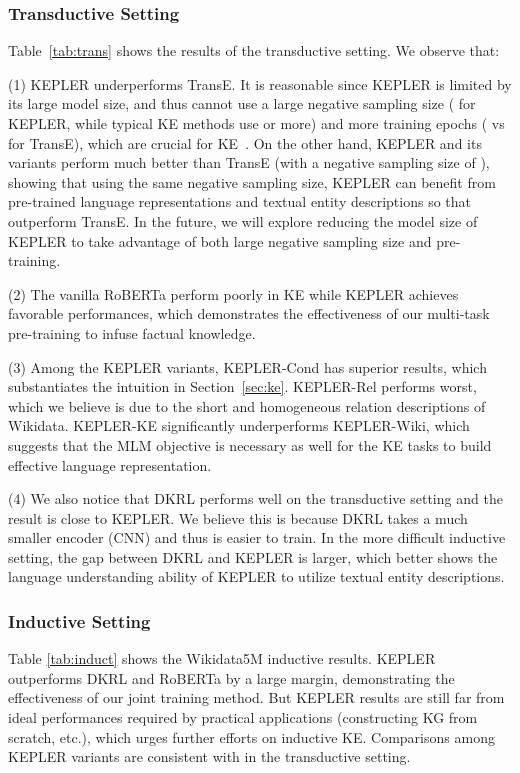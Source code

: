 \subsubsection*{Transductive Setting}




Table~\ref{tab:trans} shows the results of the transductive setting. We observe that: 

(1) KEPLER underperforms TransE. It is reasonable since KEPLER is limited by its large model size, and thus cannot use a large negative sampling size ( for KEPLER, while typical KE methods use  or more) and more training epochs ( vs  for TransE), which are crucial for KE~\citep{zhu2019graphvite}. On the other hand, KEPLER and its variants perform much better than TransE (with a negative sampling size of ), showing that using the same negative sampling size, KEPLER can benefit from pre-trained language representations and textual entity descriptions so that outperform TransE. In the future, we will explore reducing the model size of KEPLER to take advantage of both large negative sampling size and pre-training.

(2) The vanilla RoBERTa perform poorly in KE while KEPLER achieves favorable performances, which demonstrates the effectiveness of our multi-task pre-training to infuse factual knowledge. 

(3) Among the KEPLER variants, KEPLER-Cond has superior results, which substantiates the intuition in Section~\ref{sec:ke}. KEPLER-Rel performs worst, which we believe is due to the short and homogeneous relation descriptions of Wikidata. KEPLER-KE significantly underperforms KEPLER-Wiki, which suggests that the MLM objective is necessary as well for the KE tasks to build effective language representation.

(4) We also notice that DKRL performs well on the transductive setting and the result is close to KEPLER. We believe this is because DKRL takes a much smaller encoder (CNN) and thus is easier to train. In the more difficult inductive setting, the gap between DKRL and KEPLER is larger, which better shows the language understanding ability of KEPLER to utilize textual entity descriptions.



\subsubsection*{Inductive Setting}

Table \ref{tab:induct} shows the Wikidata5M inductive results. KEPLER outperforms DKRL and RoBERTa by a large margin, demonstrating the effectiveness of our joint training method. But KEPLER results are still far from ideal performances required by practical applications (constructing KG from scratch, etc.), which urges further efforts on inductive KE. Comparisons among KEPLER variants are consistent with in the transductive setting. 

